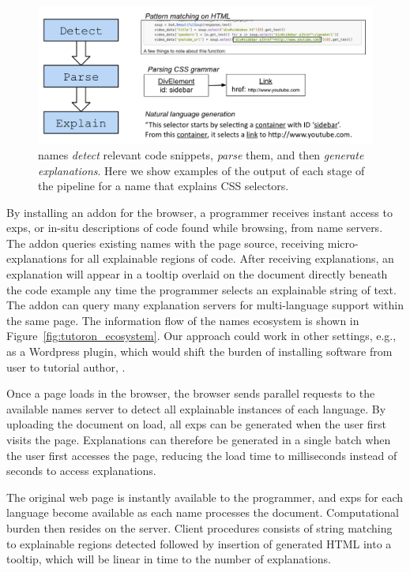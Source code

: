 \begin{figure}
\centering
    \includegraphics[width=\columnwidth]{figures/explanation_pipeline}
    \caption{\Glspl{name} \emph{detect} relevant code snippets, \emph{parse} them, and then \emph{generate explanations}.  Here we show examples of the output of each stage of the pipeline for a \gls{name} that explains CSS selectors.}\label{fig:explanation_pipeline}
\end{figure}
\fi

By installing an addon for the browser, a programmer receives instant access to \glspl{exp}, or in-situ descriptions of code found while browsing, from \gls{name} servers.
The addon queries existing \glspl{name} with the page source, receiving micro-explanations for all explainable regions of code.
After receiving explanations, an explanation will appear in a tooltip overlaid on the document directly beneath the code example any time the programmer selects an explainable string of text.
The addon can query many explanation servers for multi-language support within the same page.
The information flow of the \glspl{name} ecosystem is shown in Figure~\ref{fig:tutoron_ecosystem}.
Our approach could work in other settings, e.g., as a Wordpress plugin, which would shift the burden of installing software from user to tutorial author, .

\begin{changes}
Once a page loads in the browser, the browser sends parallel requests to the available \glspl{name} server to detect all explainable instances of each language.
By uploading the document on load, all \glspl{exp} can be generated when the user first visits the page.
Explanations can therefore be generated in a single batch when the user first accesses the page, reducing the load time to milliseconds instead of seconds to access explanations.
\end{changes}
The original web page is instantly available to the programmer, and \glspl{exp} for each language become available as each \gls{name} processes the document.
Computational burden then resides on the server.
 Client procedures consists of string matching to explainable regions detected followed by insertion of generated HTML into a tooltip, which will be linear in time to the number of explanations.\fi

